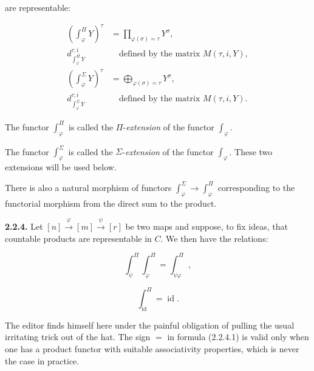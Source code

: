 %
%
are representable:

\begin{equation}
  \begin{aligned}
    \left(\int_{\varphi}^{\Pi}Y\right)^{\tau}
      &=\prod_{\varphi(\sigma)=\tau}Y^{\sigma},\\
    d_{\int_{\varphi}^{\Pi}Y}^{\tau,i}
      &\quad\text{defined by the matrix }M(\tau,i,Y),\\[2pt]
    \left(\int_{\varphi}^{\Sigma}Y\right)^{\tau}
      &=\bigoplus_{\varphi(\sigma)=\tau}Y^{\sigma},\\
    d_{\int_{\varphi}^{\Sigma}Y}^{\tau,i}
      &\quad\text{defined by the matrix }M(\tau,i,Y).
  \end{aligned}
  \tag{2.2.3.3}
\end{equation}

The functor $\int_{\varphi}^{\Pi}$ is called the
$\Pi$-\emph{extension} of the functor $\int_\varphi$.

The functor $\int_{\varphi}^{\Sigma}$ is called the
$\Sigma$-\emph{extension} of the functor $\int_\varphi$. These two
extensions will be used below.

There is also a natural morphism of functors
$\int_{\varphi}^{\Sigma}\longrightarrow\int_{\varphi}^{\Pi}$
corresponding to the functorial morphism from the direct sum to the product.

\noindent\textbf{2.2.4.}\quad
Let
$[n]\xrightarrow{\varphi}[m]\xrightarrow{\psi}[r]$ be two maps and suppose,
to fix ideas, that countable products are representable in $C$. We then have
the relations:

\begin{equation}
  \int_{\psi}^{\Pi}\int_{\varphi}^{\Pi}
  =\int_{\psi\varphi}^{\Pi},
  \tag{2.2.4.1}
\end{equation}

\begin{equation}
  \int_{\operatorname{id}}^{\Pi}=\operatorname{id}.
  \tag{2.2.4.2}
\end{equation}

The editor finds himself here under the painful obligation of pulling the
usual irritating trick out of the hat. The sign $=$ in formula (2.2.4.1) is
valid only when one has a product functor with suitable associativity
properties, which is never the case in practice.

